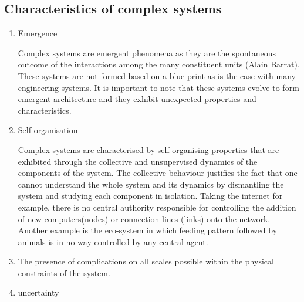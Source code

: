 \documentclass[10pt,a4paper]{article}
\begin{document}
	
	\subsection{Characteristics of complex systems}
	\begin{enumerate}
	\item Emergence
	
	Complex systems are emergent phenomena as they are the spontaneous outcome of the interactions among the many constituent units (Alain Barrat). These systems are not formed based on a blue print as is the case with many engineering systems. It is important to note that these systems evolve to form emergent architecture and they exhibit unexpected properties and characteristics.
	\item Self organisation
	
	Complex systems are characterised by self organising properties that are exhibited through the collective and unsupervised dynamics of the components of the system. The collective behaviour justifies the fact that one cannot understand the whole system and its dynamics by dismantling the system and studying each component in isolation. Taking the internet for example, there is no central authority responsible for controlling the addition of new computers(nodes) or connection lines (links) onto the network. Another example is the eco-system in which feeding pattern followed by animals is in no way controlled by any central agent. 
	
	\item The presence of
	complications on all scales possible within the physical constraints of the system.
	\item uncertainty
\end{enumerate}
	
\end{document}
